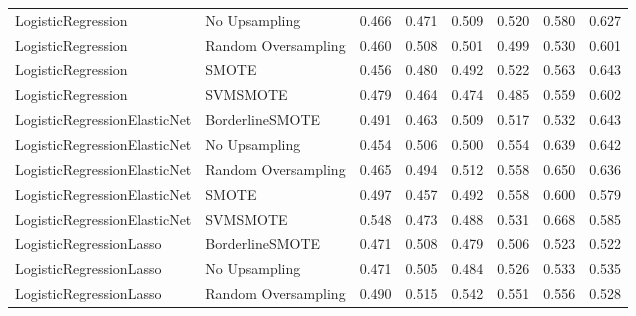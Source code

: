 \begin{tabular}{llllllll}
          LogisticRegression &       No Upsampling & 0.466 &                     0.471 &                 0.509 &                  0.520 &                                   0.580 &     0.627 \\
          LogisticRegression & Random Oversampling & 0.460 &                     0.508 &                 0.501 &                  0.499 &                                   0.530 &     0.601 \\
          LogisticRegression &               SMOTE & 0.456 &                     0.480 &                 0.492 &                  0.522 &                                   0.563 &     0.643 \\
          LogisticRegression &            SVMSMOTE & 0.479 &                     0.464 &                 0.474 &                  0.485 &                                   0.559 &     0.602 \\
LogisticRegressionElasticNet &     BorderlineSMOTE & 0.491 &                     0.463 &                 0.509 &                  0.517 &                                   0.532 &     0.643 \\
LogisticRegressionElasticNet &       No Upsampling & 0.454 &                     0.506 &                 0.500 &                  0.554 &                                   0.639 &     0.642 \\
LogisticRegressionElasticNet & Random Oversampling & 0.465 &                     0.494 &                 0.512 &                  0.558 &                                   0.650 &     0.636 \\
LogisticRegressionElasticNet &               SMOTE & 0.497 &                     0.457 &                 0.492 &                  0.558 &                                   0.600 &     0.579 \\
LogisticRegressionElasticNet &            SVMSMOTE & 0.548 &                     0.473 &                 0.488 &                  0.531 &                                   0.668 &     0.585 \\
     LogisticRegressionLasso &     BorderlineSMOTE & 0.471 &                     0.508 &                 0.479 &                  0.506 &                                   0.523 &     0.522 \\
     LogisticRegressionLasso &       No Upsampling & 0.471 &                     0.505 &                 0.484 &                  0.526 &                                   0.533 &     0.535 \\
     LogisticRegressionLasso & Random Oversampling & 0.490 &                     0.515 &                 0.542 &                  0.551 &                                   0.556 &     0.528 \\

\end{tabular}
